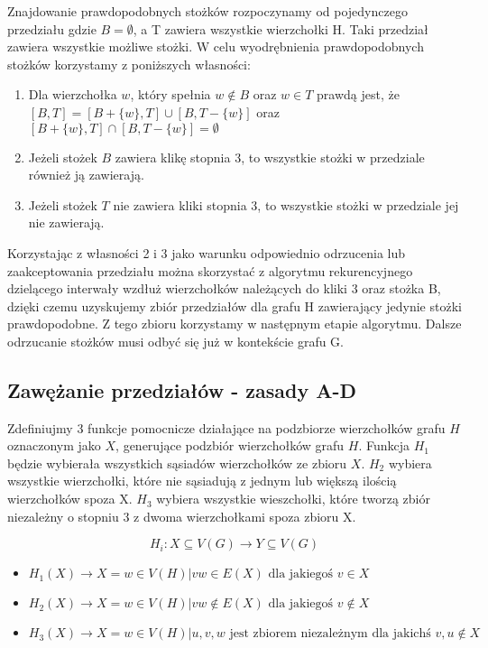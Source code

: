 Znajdowanie prawdopodobnych stożków rozpoczynamy od pojedynczego przedziału gdzie $B = \emptyset$, a T zawiera wszystkie wierzchołki H. Taki przedział zawiera wszystkie możliwe stożki. W celu wyodrębnienia prawdopodobnych stożków korzystamy z poniższych własności:
\begin{enumerate}
\item Dla wierzchołka $w$, który spełnia $w \notin B$ oraz $w\in T$ prawdą jest, że $[B, T] = [B + \{ w\}, T] \cup [B , T - \{ w\}]$ oraz $[B +\{ w\}, T] \cap [B , T - \{ w\}] = \emptyset$

\item Jeżeli stożek $B$ zawiera klikę stopnia 3, to wszystkie stożki w przedziale również ją zawierają. 

\item Jeżeli stożek $T$ nie zawiera kliki stopnia 3, to wszystkie stożki w przedziale jej nie zawierają.
\end{enumerate}

Korzystając z własności 2 i 3 jako warunku odpowiednio odrzucenia lub zaakceptowania przedziału można skorzystać z algorytmu rekurencyjnego dzielącego interwały wzdłuż wierzchołków należących do kliki 3 oraz stożka B, dzięki czemu uzyskujemy zbiór przedziałów dla grafu H zawierający jedynie stożki prawdopodobne. Z tego zbioru korzystamy w następnym etapie algorytmu.
Dalsze odrzucanie stożków musi odbyć się już w kontekście grafu G.
  

\subsection{Zawężanie przedziałów - zasady A-D}
Zdefiniujmy 3 funkcje pomocnicze działające na podzbiorze wierzchołków grafu $H$ oznaczonym jako $X$, generujące podzbiór wierzchołków grafu $H$. 
Funkcja $H_1$ będzie wybierała wszystkich sąsiadów wierzchołków ze zbioru $X$.
$H_2$ wybiera wszystkie wierzchołki, które nie sąsiadują z jednym lub większą ilością wierzchołków spoza X. 
$H_3$ wybiera wszystkie wieszchołki, które tworzą zbiór niezależny o stopniu 3 z dwoma wierzchołkami spoza zbioru X.

$$H_i: X \subseteq V(G) \to Y \subseteq V(G)$$

\begin{itemize}
    
  \item   $H_1(X) \to X = { w \in V(H) | vw \in E(X) \textrm{ dla jakiegoś } v \in X }$ 
  
  \item   $H_2(X) \to X = { w \in V(H) | vw \notin E(X) \textrm{ dla jakiegoś } v \notin X}$
  
  \item   $H_3(X) \to X = { w \in V(H) | { u, v, w } \textrm{ jest zbiorem niezależnym dla jakichś } v, u \notin X}$ 
\end{itemize}


